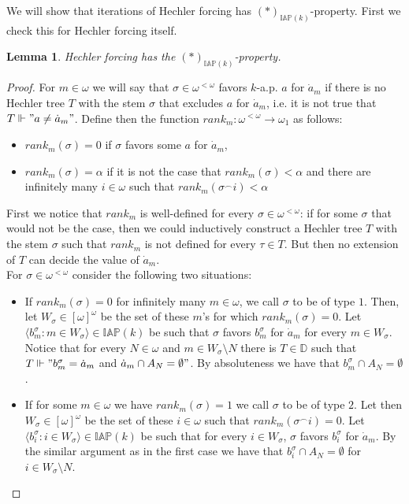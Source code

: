 \documentclass[a4paper]{amsart}
\newtheorem{lemma}[theorem]{Lemma}
\newcommand{\baire}{\omega^{<\omega}}
\newcommand{\IAP}{\mathbb{IAP}}
\begin{document}
We will show that iterations of Hechler forcing has $(*)_{\IAP(k)}$-property. First we check this for Hechler forcing itself.
\begin{lemma}\label{lemmaIteratonHechler}
    Hechler forcing has the $(*)_{\IAP(k)}$-property.
\end{lemma}
\begin{proof}
    For $m\in\omega$ we will say that $\sigma\in\baire$ favors $k$-a.p. $a$ for $\dot{a}_{m}$ if there is no Hechler tree $T$ with the stem $\sigma$ that excludes $a$ for $\dot{a}_{m}$, i.e. it is not true that $T\Vdash"a\neq\dot{a}_{m}"$. Define then the function $rank_{m}:\baire\rightarrow\omega_{1}$ as follows:
    \begin{itemize}
        \item[--] $rank_{m}(\sigma)=0$ if $\sigma$ favors some $a$ for $\dot{a}_{m}$,
        \item[--] $rank_{m}(\sigma)=\alpha$ if it is not the case that $rank_{m}(\sigma)<\alpha$ and there are infinitely many $i\in\omega$ such that $rank_{m}(\sigma^{\frown}i)<\alpha$
    \end{itemize}
First we notice that $rank_{m}$ is well-defined for every $\sigma\in\baire$: if for some $\sigma$ that would not be the case, then we could inductively construct a Hechler tree $T$ with the stem $\sigma$ such that $rank_{m}$ is not defined for every $\tau\in T$. But then no extension of $T$ can decide the value of $\dot{a}_{m}$.\\
For $\sigma\in\baire$ consider the following two situations:
\begin{itemize}
    \item[1.] If $rank_{m}(\sigma)=0$ for infinitely many $m\in\omega$, we call $\sigma$ to be of type $1$. Then, let $W_{\sigma}\in[\omega]^{\omega}$ be the set of these $m$'s for which $rank_{m}(\sigma)=0$. Let $\langle b^{\sigma}_{m}:m\in W_{\sigma}\rangle\in\IAP(k)$ be such that $\sigma$ favors $b^{\sigma}_{m}$ for $\dot{a}_{m}$ for every $m\in W_{\sigma}$. Notice that for every $N\in\omega$ and $m\in W_{\sigma}\setminus N$ there is $T\in\mathbb{D}$ such that $T\Vdash"b^{\sigma}_{m}=\dot{a}_{m}$ and $\dot{a}_{m}\cap A_{N}=\emptyset"$. By absoluteness we have that $b^{\sigma}_{m}\cap A_{N}=\emptyset$.
    \item[2.] If for some $m\in\omega$ we have $rank_{m}(\sigma)=1$ we call $\sigma$ to be of type $2$. Let then $W_{\sigma}\in[\omega]^{\omega}$ be the set of these $i\in\omega$ such that $rank_{m}(\sigma^{\frown}i)=0$. Let $\langle b^{\sigma}_{i}:i\in W_{\sigma}\rangle\in \IAP(k)$ be such that for every $i\in W_{\sigma}$, $\sigma$ favors $b^{\sigma}_{i}$ for $\dot{a}_{m}$. By the similar argument as in the first case we have that $b^{\sigma}_{i}\cap A_{N}=\emptyset$ for $i\in W_{\sigma}\setminus N$. 

\end{itemize}
\end{proof}
\end{document}
